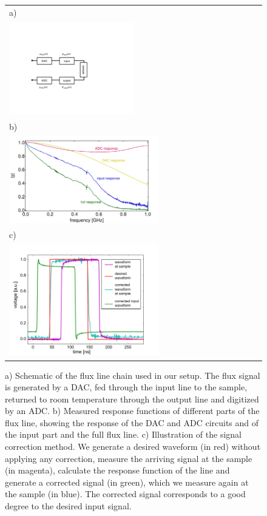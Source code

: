 \begin{figure}
	\begin{tabular}{l}
	 a) \\ \includegraphics[width=0.5\textwidth]{"./material/figures/measurement/fluxline_model"} \\
	 b) \\ \includegraphics[width=0.6\textwidth]{"./material_thesis/fluxline response/response"} \\
	 c) \\ \includegraphics[width=0.6\textwidth]{"./data/ct5/2010_06_15 - fluxline response/test_measurement_modified"}
	 \end{tabular}
	 \caption[]{a) Schematic of the flux line chain used in our setup. The flux signal is generated by a DAC, fed through the input line to the sample, returned to room temperature through the output line and digitized by an ADC. b) Measured response functions of different parts of the flux line, showing the response of the DAC and ADC circuits and of the input part and the full flux line. c) Illustration of the signal correction method. We generate a desired waveform (in red) without applying any correction, measure the arriving signal at the sample (in magenta), calculate the response function of the line and generate a corrected signal (in green), which we measure again at the sample (in blue). The corrected signal corresponds to a good degree to the desired input signal.}
	 \label{fig:FluxLineResponseFunction}
\end{figure}

